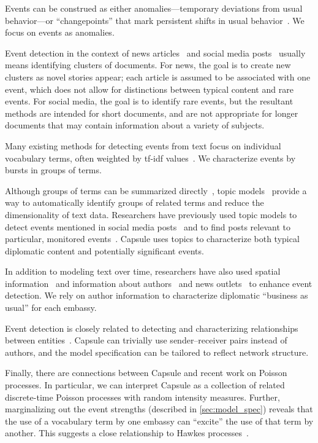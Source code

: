 Events can be construed as either anomalies---temporary deviations
from usual behavior---or ``changepoints'' that mark persistent shifts
in usual behavior~\cite{guralnik1999event,adams2007bayesian}. We focus
on events as anomalies.

Event detection in the context of news
articles~\cite{zhao2012novel,zhao2007temporal,zhang2002novelty,li2005probabilistic,wang2007mining,allan1998line}
and social media
posts~\cite{atefeh2015survey,VanDam:2012,lau2012line,jackoway2011identification,sakaki2010earthquake,reuter2012event,becker2010learning,sayyadi2009event}
usually means identifying clusters of documents. For news, the goal is
to create new clusters as novel stories appear; each article is assumed
to be associated with one event, which does not allow for distinctions
between typical content and rare events.
For social media, the goal is
to identify rare events, but the resultant methods are intended for
short documents, and are not appropriate for longer documents that may
contain information about a variety of subjects.

Many existing methods for detecting events from text focus on
individual vocabulary terms, often weighted by tf-idf
values~\cite{fung2005parameter,kumaran2004text,brants2003system,das2011dynamic,zhao2007temporal,zhao2012novel}.
We characterize events by bursts in groups of terms.

Although groups of terms can be summarized
directly~\cite{peng2007event,chakrabarti2011event,gao2012joint}, topic
models~\cite{Blei:2012} provide a way to automatically identify groups
of related terms and reduce the dimensionality of text
data. Researchers have previously used topic models to detect events
mentioned in social media posts~\cite{lau2012line,dou2012leadline} and
to find posts relevant to particular, monitored
events~\cite{VanDam:2012}. Capsule uses topics to characterize both
typical diplomatic content and potentially significant events.

In addition to modeling text over time, researchers have also used
spatial
information~\cite{Neill:2005,mathioudakis2010identifying,liu2011using}
and information about authors~\cite{zhao2007temporal} and news
outlets~\cite{wang2007mining} to enhance event detection. We rely on
author information to characterize diplomatic ``business as usual''
for each embassy.

Event detection is closely related to detecting and characterizing
relationships between
entities~\cite{schein2015bayesian,linderman2014discovering,das2011dynamic}. Capsule
can trivially use sender--receiver pairs instead of authors, and the
model specification can be tailored to reflect network structure.

Finally, there are connections between Capsule and recent work on
Poisson processes. In particular, we can interpret Capsule as a
collection of related discrete-time Poisson processes with random
intensity measures. Further, marginalizing out the event strengths
(described in \cref{sec:model_spec}) reveals that the use of a
vocabulary term by one embassy can ``excite'' the use of that term by
another. This suggests a close relationship to Hawkes
processes~\cite{hawkes1971spectra}.
